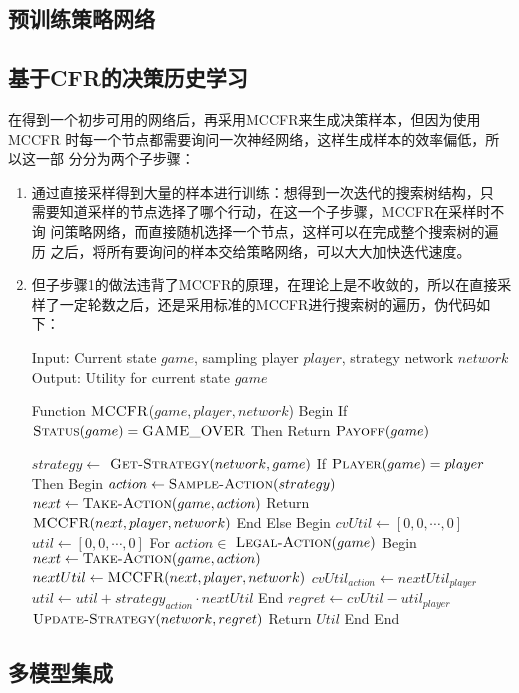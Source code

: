 \documentclass[11pt]{article}
\begin{document}
\subsection{预训练策略网络}
\label{sec:org0ee1659}

\subsection{基于CFR的决策历史学习}
\label{sec:org3a66aba}
在得到一个初步可用的网络后，再采用MCCFR来生成决策样本，但因为使用MCCFR
时每一个节点都需要询问一次神经网络，这样生成样本的效率偏低，所以这一部
分分为两个子步骤：
\begin{enumerate}
\item 通过直接采样得到大量的样本进行训练：想得到一次迭代的搜索树结构，只
需要知道采样的节点选择了哪个行动，在这一个子步骤，MCCFR在采样时不询
问策略网络，而直接随机选择一个节点，这样可以在完成整个搜索树的遍历
之后，将所有要询问的样本交给策略网络，可以大大加快迭代速度。
\item 但子步骤1的做法违背了MCCFR的原理，在理论上是不收敛的，所以在直接采
样了一定轮数之后，还是采用标准的MCCFR进行搜索树的遍历，伪代码如下：

\begin{algorithm}[caption={MCCFR训练决策网络伪代码}, label={code:mccfr}]
Input: Current state $game$, sampling player $player$, strategy network $network$
Output: Utility for current state $game$

Function $\textsc{MCCFR}$($game, player, network$) Begin
	If $\textsc{Status}(game) = \textsc{GAME\_OVER}$ Then
		Return $\textsc{Payoff}(game)$

	$strategy \gets$ $\textsc{Get-Strategy}(network, game)$
	If $\textsc{Player}(game)=player$ Then Begin
		$action \gets \textsc{Sample-Action}(strategy)$
		$next \gets \textsc{Take-Action}(game, action)$
		Return $\textsc{MCCFR}(next, player, network)$
	End Else Begin
		$cvUtil \gets [0, 0, \cdots, 0]$
		$util \gets [0, 0,  \cdots, 0]$
		For $action \in$ $\textsc{Legal-Action}(game)$ Begin
			$next \gets \textsc{Take-Action}(game, action)$
			$nextUtil \gets \textsc{MCCFR}(next, player, network)$
			$cvUtil_{action} \gets nextUtil_{player}$
			$util \gets util + strategy_{action}\cdot nextUtil$
		End
		$regret \gets cvUtil - util_{player}$
		$\textsc{Update-Strategy}(network, regret)$
		Return $Util$
	End
End
\end{algorithm}
\end{enumerate}

\subsection{多模型集成}
\label{sec:org4acab7c}
\end{document}
